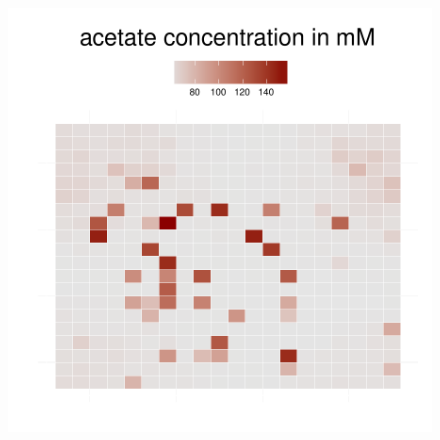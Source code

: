 \begin{figure}[h]
{\begin{minipage}[t]{0.3\textwidth}
  \end{minipage}
  \begin{minipage}[t]{0.3\textwidth}
    \includegraphics[width=\textwidth]{../results/ecoli_20x20_aerob_seed55_ace50.pdf}
  \end{minipage}
  }
\end{figure}
